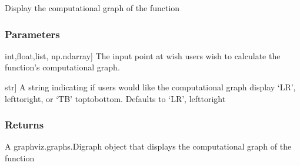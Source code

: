 \documentclass[letterpaper,10pt,english]{sphinxmanual}
\begin{document}
\begin{fulllineitems}
\begin{fulllineitems}
\end{fulllineitems}


\begin{fulllineitems}
\label{\detokenize{autodiff:autodiff.func.Func.graph}}
\pysigstartsignatures
{}
\pysigstopsignatures
\sphinxAtStartPar
Display the computational graph of the function


\subsubsection{Parameters}
\label{\detokenize{autodiff:id1}}\begin{description}
\sphinxlineitem{point}{[}int,float,list, np.ndarray{]}
\sphinxAtStartPar
The input point at wish users wish to calculate the function’s computational graph.

\sphinxlineitem{graph\_direction}{[}str{]}
\sphinxAtStartPar
A string indicating if users would like the computational graph display ‘LR’, left\sphinxhyphen{}to\sphinxhyphen{}right,
or ‘TB’ top\sphinxhyphen{}to\sphinxhyphen{}bottom. Defaults to ‘LR’, left\sphinxhyphen{}to\sphinxhyphen{}right

\end{description}


\subsubsection{Returns}
\label{\detokenize{autodiff:id2}}\begin{description}
\sphinxAtStartPar
A graphviz.graphs.Digraph object that displays the computational graph of the function

\end{description}



\end{fulllineitems}
\end{fulllineitems}
\end{document}
